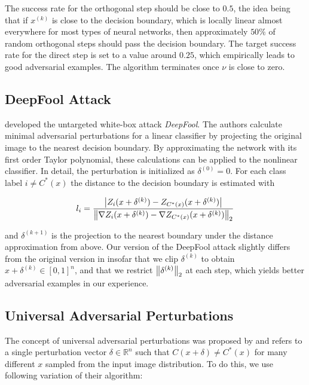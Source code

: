 The success rate for the orthogonal step should be close to $0.5$, the idea being that if $x^{(k)}$ is close to the decision boundary, which is locally linear almost everywhere for most types of neural networks, then approximately $50\%$ of random orthogonal steps should pass the decision boundary. 
The target success rate for the direct step is set to a value around $0.25$, which empirically leads to good adversarial examples.
The algorithm terminates once $\nu$ is close to zero.

\subsection{DeepFool Attack}

\citet{deepfool} developed the untargeted white-box attack \emph{DeepFool}.
The authors calculate minimal adversarial perturbations for a linear classifier by projecting the original image to the nearest decision boundary.
By approximating the network with its first order Taylor polynomial, these calculations can be applied to the nonlinear classifier.
In detail, the perturbation is initialized as $\delta^{(0)} = 0$.
For each class label $i \neq C^*(x)$ the distance to the decision boundary is estimated with

\begin{equation}
l_i = 
\frac{
	\left \lvert Z_i(x + \delta^{(k)}) - Z_{C^*(x)}(x + \delta^{(k)}) \right \rvert
}
{
	\left \lVert \nabla Z_i(x + \delta^{(k)}) - \nabla Z_{C^*(x)}(x + \delta^{(k)}) \right \rVert _{2}
}
\end{equation}


and $\delta^{(k+1)}$ is the projection to the nearest boundary under the distance approximation from above.
Our version of the DeepFool attack slightly differs from the original version in insofar that we clip $\delta^{(k)}$ to obtain $x + \delta^{(k)} \in [0,1]^n$, and that we restrict $\left \lVert \delta^{(k)} \right \rVert _{2}$ at each step, which yields better adversarial examples in our experience.

\subsection{Universal Adversarial Perturbations}

The concept of universal adversarial perturbations was proposed by \citet{universal} and refers to a single perturbation vector $\delta \in \mathbb{R}^n$ such that $C(x + \delta) \neq C^*(x)$ for many different $x$ sampled from the input image distribution.
To do this, we use following variation of their algorithm:

